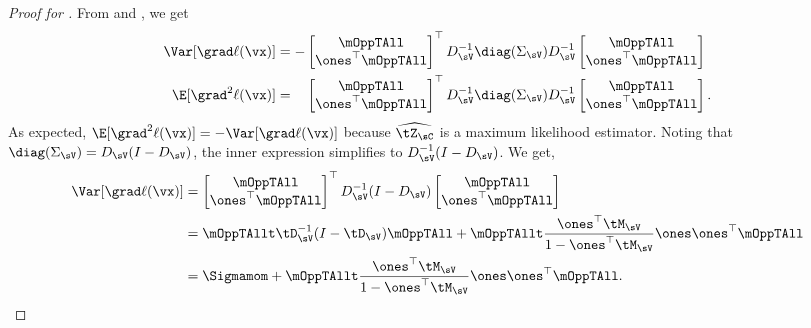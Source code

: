 \begin{proof}[Proof for ]
From  and , we get
  \begin{align*}
    \Var [\grad \ell(\vx)] &= -
        \begin{bmatrix}
          \mOppTAll \\
          \ones^\top \mOppTAll
        \end{bmatrix}^\top
          D_{\sV}^{-1} \diag(\Sigma_\sV) D_{\sV}^{-1} 
        \begin{bmatrix}
          \mOppTAll \\
          \ones^\top \mOppTAll
        \end{bmatrix} \\
        \E[\grad^2 \ell(\vx)] 
        &= \hphantom{-}
        \begin{bmatrix}
          \mOppTAll \\
          \ones^\top \mOppTAll
        \end{bmatrix}^\top
          D_{\sV}^{-1} \diag(\Sigma_\sV) D_{\sV}^{-1} 
        \begin{bmatrix}
          \mOppTAll \\
          \ones^\top \mOppTAll
        \end{bmatrix}.
  \end{align*}
As expected, $\E[\grad^2 \ell(\vx)] = -\Var [\grad \ell(\vx)]$ because
$\widehat{\tZ_\sC}$ is a maximum likelihood estimator. 
Noting that $\diag(\Sigma_\sV) = D_\sV (I - D_\sV)$, the inner
  expression simplifies to $D_\sV^{-1} (I - D_\sV)$. We get,
\begin{align*}
  \Var [\grad \ell(\vx)] &=
      \begin{bmatrix}
        \mOppTAll \\
        \ones^\top \mOppTAll
      \end{bmatrix}^\top
        D_{\sV}^{-1} (I - D_\sV) 
      \begin{bmatrix}
        \mOppTAll \\
        \ones^\top \mOppTAll
      \end{bmatrix} \\
   &=
    \mOppTAllt \tD_{\sV}^{-1} (I - \tD_\sV) \mOppTAll + \mOppTAllt \frac{\ones^\top \tM_\sV}{1 - \ones^\top \tM_\sV} \ones\ones^\top \mOppTAll \\
   &= \Sigmamom + \mOppTAllt \frac{\ones^\top \tM_\sV}{1 - \ones^\top \tM_\sV} \ones\ones^\top \mOppTAll.
\end{align*}


\end{proof}
